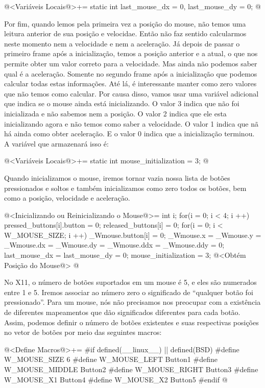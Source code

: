 \iniciocodigo
@<Variáveis Locais@>+=
static int last_mouse_dx = 0, last_mouse_dy = 0;
@
\fimcodigo

Por fim, quando lemos pela primeira vez a posição do mouse, não temos
uma leitura anterior de sua posição e velocidae. Então não faz sentido
calcularmos neste momento nem a velocidade e nem a aceleração. Já
depois de passar o primeiro frame após a inicialização, temos a
posição anterior e a atual, o que nos permite obter um valor correto
para a velocidade. Mas ainda não podemos saber qual é a
aceleração. Somente no segundo frame após a inicialização que podemos
calcular todas estas informações. Até lá, é interessante manter como
zero valores que não temos como calcular. Por causa disso, vamos usar
uma variável adicional que indica se o mouse ainda está
inicializando. O valor 3 indica que não foi inicializada e não sabemos
nem a posição. O valor 2 indica que ele esta inicializando agora e não
temos como saber a velocidade. O valor 1 indica que nã há ainda como
obter aceleração. E o valor 0 indica que a inicialização terminou. A
variável que armazenará isso é:

\iniciocodigo
@<Variáveis Locais@>+=
static int mouse_initialization = 3;
@
\fimcodigo

Quando inicializamos o mouse, iremos tornar vazia nossa lista de
botões pressionados e soltos e também inicializamos como zero todos os
botões, bem como a posição, velocidade e aceleração.

\iniciocodigo
@<Inicializando ou Reinicializando o Mouse@>=
{
  int i;
  for(i = 0; i < 4; i ++){
    pressed_buttons[i].button = 0;
    released_buttons[i] = 0;
  }
  for(i = 0; i < W_MOUSE_SIZE; i ++)
    _Wmouse.button[i] = 0;
  _Wmouse.x = _Wmouse.y = _Wmouse.dx = _Wmouse.dy = _Wmouse.ddx = _Wmouse.ddy = 0;
  last_mouse_dx = last_mouse_dy = 0;
  mouse_initialization = 3;
  @<Obtém Posição do Mouse@>
}
@
\fimcodigo


No X11, o número de botões suportados em um mouse é 5, e eles são
numerados entre 1 e 5. Iremos associar ao número zero o significado de
``qualquer botão foi pressionado''. Para um mouse, nós não precisamos
nos preocupar com a existência de diferentes mapeamentos que dão
significados diferentes para cada botão. Assim, podemos definir o
número de botões existentes e suas respectivas posições no vetor de
botões por meio das seguintes macros:

\iniciocodigo
@<Define Macros@>+=
#if defined(__linux__) || defined(BSD)
#define W_MOUSE_SIZE 6
#define W_MOUSE_LEFT   Button1
#define W_MOUSE_MIDDLE Button2
#define W_MOUSE_RIGHT  Button3
#define W_MOUSE_X1     Button4
#define W_MOUSE_X2     Button5
#endif
@
\fimcodigo

